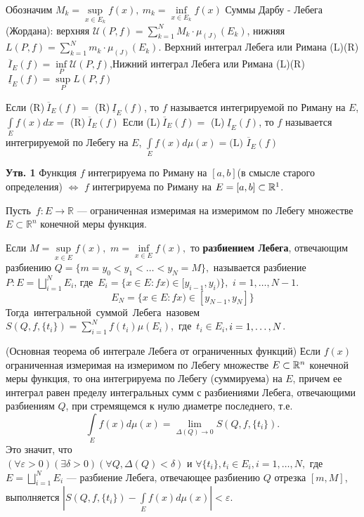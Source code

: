 \begin{multicols}{2}
\begin{definition}{}{}
Обозначим $M_k=\sup\limits_{x\in E_k} f\left(x\right) ,\  m_k=\inf\limits_{x\in E_k}f\left(x\right)$ \newline
Суммы Дарбу - Лебега (Жордана): верхняя $\mathcal{U}(P, f)=\sum\limits_{k=1}^N M_k \cdot \mu_{(J)}(E_k)$, нижняя $L(P, f)=\sum\limits_{k=1}^N m_k \cdot \mu_{(J)}(E_k)$.
\newline Верхний интеграл Лебега или Римана (L)(R)$\ \overline{I}_E(f)=\inf\limits_P \mathcal{U}(P, f)$,\newline Нижний интеграл Лебега или Римана (L)(R)$\ \underline{I}_E(f)=\sup\limits_P L(P, f)$
\end{definition}
\begin{definition}{}{}
Если (R)$\ \overline{I}_E(f)=$ (R)$\ \underline{I}_E(f)$, то $f$ называется интегрируемой по Риману на $E$, $\int\limits_E f(x)dx=$ (R)$\ \overline{I}_E(f)$ \newline
Если (L)$\ \overline{I}_E(f)=$ (L)$\ \underline{I}_E(f)$, то $f$ называется интегрируемой по Лебегу на $E$, $\int\limits_E f(x)d\mu (x)= \text{(L) }\overline{I}_E(f)$
\end{definition}
\textbf{Утв. 1} Функция $f$ интегрируема по Риману на $[a,b]$(в смысле старого определения) $\Leftrightarrow$ $f$ интегрируема по Риману на $E=[a,b] \subset \mathbb{R}^1$.
\begin{definition}{}{}
	\mbox{Пусть $ f:E\to\mathbb{R} $} ---  ограниченная измеримая на измеримом по Лебегу множестве \mbox{$ E\subset\mathbb{R}^n $} конечной меры функция.

	Если $ M=\sup\limits_{x\in E}f(x), $ $ m=\inf\limits_{x\in E}f(x), $ то \textbf{разбиением Лебега}, отвечающим разбиению $ Q=\{m=y_0<y_1<\ldots <y_N=M\}, $ называется разбиение
	$ P: E=\bigsqcup\limits_{i=1}^{N}E_i$, \mbox{где $E_i=\{x\in E: fx)\in [y_{i-1}, y_i)\},$} $i=1, \ldots, N-1$.
	\[E_N= \{x\in E: fx)\in [y_{N-1}, y_N]\}\]
	\mbox{Тогда интегральной суммой Лебега назовем $S(Q, f, \{t_i\})=\sum\limits_{i=1}^N f(t_i)\mu(E_i)$, где $t_i \in E_i,$}$ 
	\newline i = 1, \ldots, N$.
\end{definition} 
\begin{theorema}{(Основная теорема об интеграле Лебега от ограниченных функций)}{}
	Если $f(x)$ ограниченная измеримая на измеримом по Лебегу множестве $ E\subset\mathbb{R}^n $ конечной меры  функция, то она интегрируема по Лебегу (суммируема) на $E$, причем ее интеграл равен пределу интегральных сумм с разбиениями Лебега, отвечающими разбиениям  $ Q $, при стремящемся к нулю диаметре последнего, т.е. $$\int\limits_E f(x)d\mu(x)=\lim_{\Delta(Q)\to 0}S(Q,f,\{t_i\}).$$
	Это значит, что $(\forall \varepsilon >0)(\exists \delta > 0)(\forall Q, \Delta(Q)<\delta) \text{ и } \forall \{t_i\}, t_i \in E_i, i=1,\ldots, N,$ где $E=\bigsqcup\limits_{i=1}^N E_i$ --- разбиение Лебега, отвечающее разбиению $Q$ отрезка $[m, M]$, выполняется $|S(Q, f, \{t_i\})-\int\limits_E f(x)d\mu(x)|<\varepsilon$.
\end{theorema}


\end{multicols}

